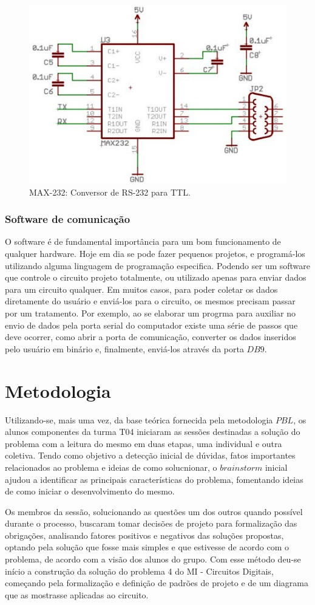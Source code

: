 \documentclass[12pt]{article}
\begin{document}
\begin{figure}[h]
\centering
\includegraphics[width=.5\textwidth]{img/Fig11-microcontroller_uart_max232_circuit.jpg}
\caption{MAX-232: Conversor de RS-232 para TTL.}
\label{fig:232}
\end{figure}

\subsubsection{Software de comunicação}

O software é de fundamental importância para um bom funcionamento de qualquer hardware. Hoje em dia se pode fazer pequenos projetos, e programá-los utilizando alguma linguagem de programação especifica. Podendo ser um software que controle o circuito projeto totalmente, ou utilizado apenas para enviar dados para um circuito qualquer. Em muitos casos, para poder coletar os dados diretamente do usuário e enviá-los para o circuito, os mesmos precisam passar por um tratamento. Por exemplo, ao se elaborar um progrma para auxiliar no envio de dados pela porta serial do computador existe uma série de passos que deve ocorrer, como abrir a porta de comunicação, converter os dados inseridos pelo usuário em binário e, finalmente, enviá-los através da porta $DB9$.

\section{Metodologia}
Utilizando-se, mais uma vez, da base teórica fornecida pela metodologia $PBL$, os alunos componentes da turma T04 iniciaram as sessões destinadas a solução do problema com a leitura do mesmo em duas etapas, uma individual e outra coletiva. Tendo como objetivo a detecção inicial de dúvidas, fatos importantes relacionados ao problema e ideias de como solucnionar, o $brainstorm$ inicial ajudou a identificar as principais características do problema, fomentando ideias de como iniciar o desenvolvimento do mesmo.


Os membros da sessão, solucionando as questões um dos outros quando possível durante o processo, buscaram tomar decisões de projeto para formalização das obrigações, analisando fatores positivos e negativos das soluções propostas, optando pela solução que fosse mais simples e que estivesse de acordo com o problema, de acordo com a visão dos alunos do grupo. Com esse método deu-se início a construção da solução do problema 4 do MI - Circuitos Digitais, começando pela formalização e definição de padrões de projeto e de um diagrama que as mostrasse aplicadas ao circuito.
\end{document}
